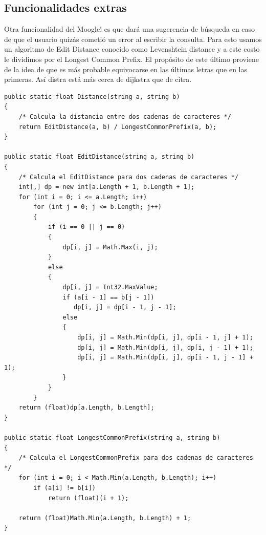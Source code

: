 \documentclass[12pt, a4paper]{article}
\begin{document}
\subsection*{Funcionalidades extras}

Otra funcionalidad del Moogle! es que dará una sugerencia de búsqueda en caso de que el usuario quizás
cometió un error al escribir la consulta. Para esto usamos un algoritmo de Edit Distance conocido como
Levenshtein distance y a este costo le dividimos por el Longest Common Prefix. El propósito de este último
proviene de la idea de que es más probable equivocarse en las últimas letras que en las primeras. Así distra
está más cerca de dijkstra que de citra.

\begin{lstlisting}
public static float Distance(string a, string b)
{
    /* Calcula la distancia entre dos cadenas de caracteres */
    return EditDistance(a, b) / LongestCommonPrefix(a, b);
}

public static float EditDistance(string a, string b)
{
    /* Calcula el EditDistance para dos cadenas de caracteres */
    int[,] dp = new int[a.Length + 1, b.Length + 1];
    for (int i = 0; i <= a.Length; i++)
        for (int j = 0; j <= b.Length; j++)
        {
            if (i == 0 || j == 0)
            {
                dp[i, j] = Math.Max(i, j);
            }
            else
            {
                dp[i, j] = Int32.MaxValue;
                if (a[i - 1] == b[j - 1])
                   dp[i, j] = dp[i - 1, j - 1];
                else
                {
                    dp[i, j] = Math.Min(dp[i, j], dp[i - 1, j] + 1);
                    dp[i, j] = Math.Min(dp[i, j], dp[i, j - 1] + 1);
                    dp[i, j] = Math.Min(dp[i, j], dp[i - 1, j - 1] + 1);
                }
            }
        }
    return (float)dp[a.Length, b.Length];
}

public static float LongestCommonPrefix(string a, string b)
{
    /* Calcula el LongestCommonPrefix para dos cadenas de caracteres */
    for (int i = 0; i < Math.Min(a.Length, b.Length); i++)
        if (a[i] != b[i])
            return (float)(i + 1);
    
    return (float)Math.Min(a.Length, b.Length) + 1;
}
\end{lstlisting}
\end{document}
